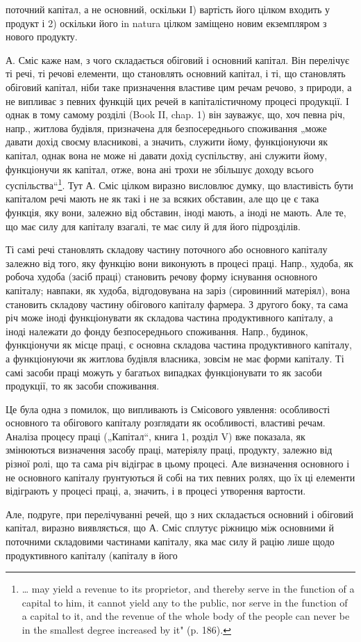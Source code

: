 \parcont{}  %
поточний капітал, а не основний, оскільки І) вартість його цілком входить
у продукт і 2) оскільки його in natura цілком заміщено новим екземпляром
з нового продукту.

А. Сміс каже нам, з чого складається обіговий і основний капітал.
Він перелічує ті речі, ті речові елементи, що становлять основний капітал,
і ті, що становлять обіговий капітал, ніби таке призначення властиве
цим речам речово, з природи, а не випливає з певних функцій
цих речей в капіталістичному процесі продукції. І однак в тому самому
розділі (Book II, chap. 1) він зауважує, що, хоч певна річ, напр., житлова
будівля, призначена для безпосереднього споживання „може давати
дохід своєму власникові, а значить, служити йому, функціонуючи як
капітал, однак вона не може ні давати дохід суспільству, ані служити
йому, функціонучи як капітал, отже, вона ані трохи не збільшує доходу
всього суспільства“\footnote*{
\dots{} may yield a revenue to its proprietor, and thereby serve in the function
of a capital to him, it cannot yield any to the public, nor serve in the function
of a capital to it, and the revenue of the whole body of the people can never be
in the smallest degree increased by it" (p. 186).
}. Тут А. Сміс цілком виразно висловлює думку, що
властивість бути капіталом речі мають не як такі і не за всяких обставин,
але що це є така функція, яку вони, залежно від обставин, іноді мають,
а іноді не мають. Але те, що має силу для капіталу взагалі, те має
силу й для його підрозділів.

Ті самі речі становлять складову частину поточного або основного
капіталу залежно від того, яку функцію вони виконують в процесі праці.
Напр., худоба, як робоча худоба (засіб праці) становить речову форму
існування основного капіталу; навпаки, як худоба, відгодовувана на
заріз (сировинний матеріял), вона становить складову частину обігового
капіталу фармера. З другого боку, та сама річ може іноді функціонувати
як складова частина продуктивного капіталу, а іноді належати до
фонду безпосереднього споживання. Напр., будинок, функціонучи як місце
праці, є основна складова частина продуктивного капіталу, а функціонуючи
як житлова будівля власника, зовсім не має форми капіталу.
Ті самі засоби праці можуть у багатьох випадках функціонувати то як
засоби продукції, то як засоби споживання.

Це була одна з помилок, що випливають із Смісового уявлення: особливості
основного та обігового капіталу розглядати як особливості,
властиві речам. Аналіза процесу праці („Капітал“, книга 1, розділ V)
вже показала, як змінюються визначення засобу праці, матеріялу праці,
продукту, залежно від різної ролі, що та сама річ відіграє в цьому
процесі. Але визначення основного і не основного капіталу ґрунтуються
й собі на тих певних ролях, що їх ці елементи відіграють у процесі праці,
а, значить, і в процесі утворення вартости.

Але, подруге, при перелічуванні речей, що з них складається основний
і обіговий капітал, виразно виявляється, що А. Сміс сплутує ріжницю
між основними й поточними складовими частинами капіталу, яка має
силу й рацію лише щодо продуктивного капіталу (капіталу в його
\parbreak{}  %
